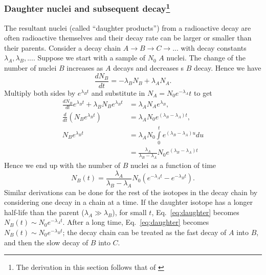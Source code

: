 \documentclass[nofootinbib,preprint,aps]{revtex4-1}
\begin{document}
        \subsubsection{Daughter nuclei and subsequent decay\footnote{The derivation in this section follows that of
        \cite[chapt. 1.5]{l01}}}
        The resultant nuclei (called ``daughter products'') from a radioactive decay are often radioactive
        themselves and their decay rate can be larger or smaller than their parents. Consider a decay chain
        $A\rightarrow B \rightarrow C \rightarrow ...$ with decay constants $\lambda_A, \lambda_B,...$. Suppose
        we start with a sample of $N_0$ $A$ nuclei. The change of the number of nuclei $B$ increases as $A$
        decays and decreases s $B$ decay. Hence we have
        \begin{equation}
            \frac{dN_B}{dt} = -\lambda_B N_B + \lambda_A N_A.
        \end{equation}
        Multiply both sides by $e^{\lambda_B t}$ and substitute in $N_A=N_0 e^{-\lambda_A} t$ to get
        \begin{align*}
            \frac{dN_B}{dt}e^{\lambda_B t} + \lambda_B N_B e^{\lambda_B t} &= \lambda_A N_A e^{\lambda_B},\nonumber\\
            \frac{d}{dt} (N_B e^{\lambda_B t}) &= \lambda_A N_0 e^{(\lambda_B-\lambda_A)t}, \nonumber\\
            N_B e^{\lambda_B t} &= \lambda_A N_0 \int\limits_0^t e^{(\lambda_B - \lambda_A)u} du \nonumber\\
                                &= \frac{\lambda_A}{\lambda_B-\lambda_A}N_0 e^{(\lambda_B - \lambda_A)t}
        \end{align*}
        Hence we end up with the number of $B$ nuclei as a function of time
        \begin{equation}
            N_B(t)=\frac{\lambda_A}{\lambda_B-\lambda_A}N_0(e^{-\lambda_A t} - e^{-\lambda_B t}).
            \label{eq:daughter}
        \end{equation}
        Similar derivations can be done for the rest of the isotopes in the decay chain by considering
        one decay in a chain at a time. If the daughter isotope has a longer half-life than the parent
        ($\lambda_A \gg \lambda_B$), for small $t$, Eq.~\ref{eq:daughter} becomes
        $N_B(t)\sim N_0 e^{-\lambda_A t}$. After a long time,
        Eq.~\ref{eq:daughter} becomes $N_B(t) \sim N_0 e^{-\lambda_B t}$; the decay
        chain can be treated as the fast decay of $A$ into $B$, and then the slow decay of $B$
        into $C$.
        
\end{document}
